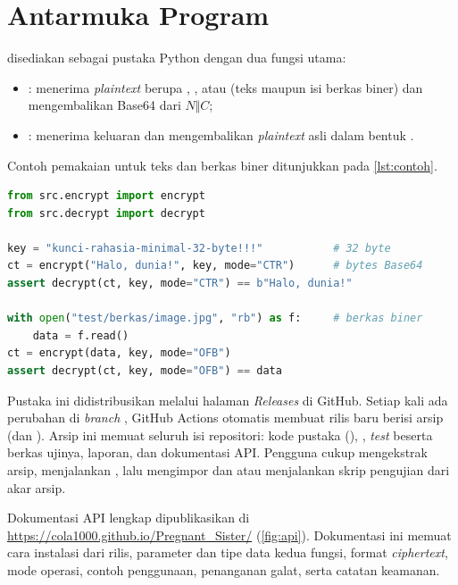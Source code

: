 \section{Antarmuka Program}
\algname{} disediakan sebagai pustaka Python dengan dua fungsi utama:
\begin{itemize}
    \item {}: menerima \textit{plaintext} berupa , , atau  (teks maupun isi berkas biner) dan mengembalikan Base64 dari $N \Vert C$;
    \item {}: menerima keluaran  dan mengembalikan \textit{plaintext} asli dalam bentuk .
\end{itemize}
Contoh pemakaian untuk teks dan berkas biner ditunjukkan pada \cref{lst:contoh}.

\noindent\begin{minipage}{\linewidth}
\begin{lstlisting}[language=Python, caption={Contoh pemakaian \code{encrypt()} dan \code{decrypt()}}, label={lst:contoh}]
from src.encrypt import encrypt
from src.decrypt import decrypt

key = "kunci-rahasia-minimal-32-byte!!!"           # 32 byte
ct = encrypt("Halo, dunia!", key, mode="CTR")      # bytes Base64
assert decrypt(ct, key, mode="CTR") == b"Halo, dunia!"

with open("test/berkas/image.jpg", "rb") as f:     # berkas biner
    data = f.read()
ct = encrypt(data, key, mode="OFB")
assert decrypt(ct, key, mode="OFB") == data
\end{lstlisting}
\end{minipage}

Pustaka ini didistribusikan melalui halaman \textit{Releases} di GitHub. Setiap kali ada perubahan di \textit{branch} , GitHub Actions otomatis membuat rilis baru berisi arsip  (dan ). Arsip ini memuat seluruh isi repositori: kode pustaka (), , \textit{test} beserta berkas ujinya, laporan, dan dokumentasi API. Pengguna cukup mengekstrak arsip, menjalankan , lalu mengimpor  dan  atau menjalankan skrip pengujian dari akar arsip.

Dokumentasi API lengkap dipublikasikan di \url{https://cola1000.github.io/Pregnant_Sister/} (\cref{fig:api}). Dokumentasi ini memuat cara instalasi dari rilis, parameter dan tipe data kedua fungsi, format \textit{ciphertext}, mode operasi, contoh penggunaan, penanganan galat, serta catatan keamanan.


